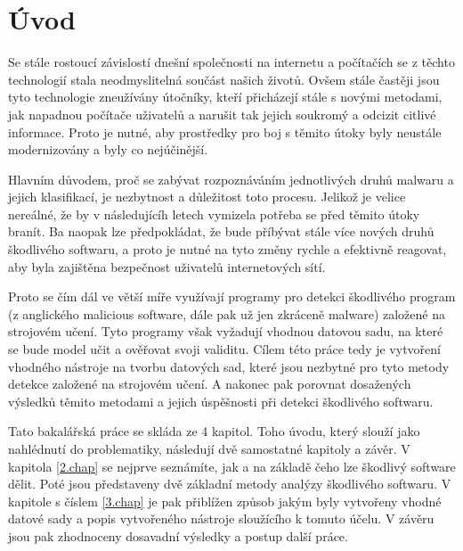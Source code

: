 
%

\chapter{Úvod}

Se stále rostoucí závislostí dnešní společnosti na internetu a počítačích se z těchto technologií stala neodmyslitelná součást našich životů. 
Ovšem stále častěji jsou tyto technologie zneužívány útočníky, kteří přicházejí stále s novými metodami, jak napadnou počítače uživatelů a narušit tak jejich soukromý a odcizit citlivé informace.
Proto je nutné, aby prostředky pro boj s těmito útoky byly neustále modernizovány a byly co nejúčinější.

Hlavním důvodem, proč se zabývat rozpoznáváním jednotlivých druhů malwaru a jejich klasifikací, je nezbytnost a důležitost toto procesu.
Jelikož je velice nereálné, že by v následujícíh letech vymizela potřeba se před těmito útoky branít. Ba naopak lze předpokládat, že 
bude příbývat stále více nových druhů škodlivého softwaru, a proto je nutné na tyto změny rychle a efektivně reagovat, aby byla zajištěna
bezpečnost uživatelů internetových sítí.

Proto se čím dál ve větší míře využívají programy pro detekci škodlivého program (z anglického malicious software, dále pak už jen zkráceně malware) založené na strojovém učení. Tyto programy však vyžadují vhodnou datovou sadu, na které se bude model učit a ověřovat svoji validitu.
Cílem této práce tedy je vytvoření vhodného nástroje na tvorbu datových sad, které jsou nezbytné pro tyto metody detekce založené na strojovém učení.
A nakonec pak porovnat dosažených výsledků těmito metodami a jejich úspěšnosti při detekci škodlivého softwaru.

Tato bakalářská práce se skláda ze 4 kapitol. Toho úvodu, který slouží jako nahlédnutí do problematiky, následují dvě samostatné kapitoly a závěr. V kapitola \ref{2.chap} se nejprve seznámíte, jak a na základě čeho lze škodlivý software dělit.
Poté jsou představeny dvě základní metody analýzy škodlivého softwaru.
V kapitole s číslem \ref{3.chap} je pak přiblížen způsob jakým byly vytvořeny vhodné datové sady a popis vytvořeného nástroje sloužícího k tomuto účelu. V závěru jsou pak zhodnoceny dosavadní výsledky a postup další práce.

